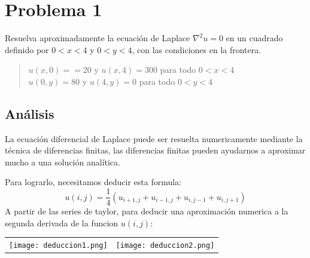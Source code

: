 \documentclass[a4paper,12pt]{article}
\newcommand{\eq}[1]{$#1$}
\begin{document}
    \section{Problema 1}
    Resuelva aproximadamente la ecuación de Laplace \eq{\nabla^2u = 0} en un
    cuadrado definido por \eq{0 < x < 4} y \eq{ 0 < y < 4}, con las condiciones en la
    frontera.
    \begin{quote}
        \centering
        \eq{u(x,0) = = 20} y \eq{u(x,4) = 300} para todo \eq{0 < x <4}\\
        \eq{u(0,y) = 80} y \eq{u(4,y) = 0} para todo \eq{0 < y <4}
    \end{quote}
    \subsection{Análisis}
    La ecuación diferencial de Laplace puede ser resuelta numericamente mediante la técnica de 
    diferencias finitas, las diferencias finitas pueden ayudarnos a aproximar mucho a una solución analítica.
    
    Para lograrlo, necesitamos deducir esta formula:
    \begin{equation}
        u(i,j) = \frac{1}{4}(u_{i+1,j}+u_{i-1,j}+u_{i,j-1}+u_{i,j+1})
    \end{equation}
    A partir de las series de taylor, para deducir una aproximación numerica a la segunda derivada de la funcion \eq{u(i,j)}:
    \begin{table}[h]
        \centering
        \begin{tabular}{cc}
            \begin{minipage}{7cm}
                \texttt{[image: deduccion1.png]}
            \end{minipage}&
            \begin{minipage}{7cm}
                \texttt{[image: deduccion2.png]}
            \end{minipage}
        \end{tabular}
    \end{table}            
\end{document}

